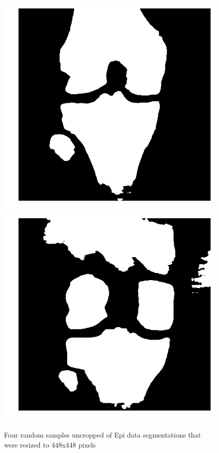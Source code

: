 \begin{figure}[H]
\endminipage\hfill
{}%
  \includegraphics[width=\linewidth]{imgs/transfer_size_y3.png}
\endminipage\hfill
{}%
  \includegraphics[width=\linewidth]{imgs/transfer_size_y4.png}
\endminipage
\caption{Four random samples uncropped of Epi data segmentations that were resized to 448x448 pixels}
\end{figure}

